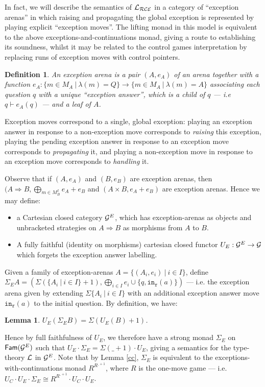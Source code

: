 \documentclass{eptcs}
\def\coprod{\bigoplus}
\def\G{{\cal{G}}}
\def\L{{\cal{L}}}
\newcommand{\inr}{{\mathtt{in_r}}}
\newcommand{\Lce}{{\cal{L_{RCE}}}}
\newcommand{\Fam}{{\mathsf{Fam}}}
\newcommand{\R}{{{R}}}
\newtheorem{lemma}[theorem]{Lemma}
\newtheorem{definition}[theorem]{Definition}
\begin{document}
{In fact, we will describe the semantics of $\Lce$ in a category of ``exception arenas'' in which raising and propagating the global exception is represented by playing explicit ``exception moves''. The lifting monad in this model is equivalent to the above exceptions-and-continuations monad, giving a route to establishing its soundness, whilst it may be related to the control games interpretation by replacing runs of exception moves with control pointers.
\begin{definition}
An exception arena is a pair $(A,e_A)$ of an arena together with a function $e_A:\{m \in M_A\ |\ \lambda(m) = Q\} \rightarrow \{m \in M_A\ |\ \lambda(m) = A\}$ associating each question $q$ with a unique ``exception answer'', which is a child of $q$  --- i.e  $q \vdash e_A(q)$ --- and a leaf of $A$.  
\end{definition}
Exception moves correspond to a single, global exception: playing an exception answer in response to a non-exception move corresponds to \emph{raising} this exception, playing the pending exception answer in response to an exception move corresponds to \emph{propagating} it, and playing  a non-exception move in response to an exception move corresponds to \emph{handling} it.

Observe that if $(A,e_A)$ and $(B,e_B)$ are exception arenas, then $(A \Rightarrow B,\coprod_{m \in M^I_B} e_A +e_B$ and $(A \times B, e_A + e_B)$ are exception arenas. Hence we may define:
\begin{itemize}
\item a Cartesian closed category $\G^E$, which has exception-arenas as objects and unbracketed strategies on $A \Rightarrow B$ as morphisms from $A$ to $B$. 
\item A fully faithful (identity on morphisms)  cartesian closed functor $U_E:\G^E \rightarrow \G$ which forgets the exception answer labelling.
\end{itemize}
Given a family of exception-arenas  $A = \{(A_i,e_i) \ |\ i \in I\}$, define $\Sigma_E A = (\Sigma(\{A_i \ |\ i \in I\} +1), \coprod_{i \in I}e_i \cup \{q,\inr(a)\})$ --- i.e. the exception arena given by extending $\Sigma\{A_i \ |\ i \in I\} $ with an additional exception answer move $\inr(a)$ to the initial question.
 By definition, we have:
\begin{lemma}\label{ff}$U_E(\Sigma_E B) =  \Sigma (U_E(B) + 1)$. 
\end{lemma}
Hence by full faithfulness of $U_E$, we therefore have a strong monad $\Sigma_E$ on $\Fam(\G^E)$ such that $U_E\cdot \Sigma_E = \Sigma(\_ +1) \cdot U_E$, giving a semantics for the type-theory $\L$ in $\G^E$. Note that by Lemma \ref{cc}, $\Sigma_E$ is equivalent to the exceptions-with-continuations monad $\R^{\R^{\_ + 1}}$, where $\R$ is the one-move game --- i.e. $ U_C\cdot U_E \cdot \Sigma_E \cong \R^{\R^{\_ + 1}}  \cdot U_C \cdot U_E$.  


}
\end{document}
